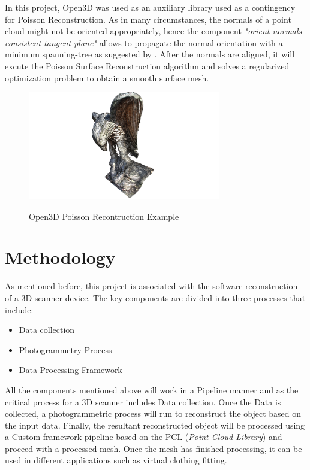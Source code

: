 \documentclass[12pt]{report}
\begin{document}
In this project, Open3D was used as an auxiliary library used as a contingency for Poisson Reconstruction. 
As in many circumstances, the normals of a point cloud might not be oriented appropriately, hence the component \textit{"orient normals consistent tangent plane"} allows to propagate the normal orientation with a minimum
spanning-tree as suggested by . 
After the normals are aligned, it will excute the Poisson Surface Reconstruction algorithm  and solves a regularized optimization problem to obtain a smooth surface mesh. 

\begin{figure}[H]%
  \centering
  \includegraphics[width=0.75\textwidth]{open3dpoisson.png}
 \caption{Open3D Poisson Recontruction Example}\cite[]{Zhou2018}
 \label{fig:Possion_exampple} 
\end{figure}




\chapter{Methodology}
As mentioned before, this project is associated with the software reconstruction of a 3D scanner device.
The key components are divided into three processes that include:

\begin{itemize}
  \item Data collection
  \item Photogrammetry Process
  \item Data Processing Framework
\end{itemize}

All the components mentioned above will work in a Pipeline manner and as the critical process for a 3D scanner includes  Data collection. 
Once the Data is collected, a photogrammetric process will run to reconstruct the object based on the input data. 
Finally, the resultant reconstructed object will be processed using a Custom framework pipeline based on the PCL (\textit{Point Cloud Library}) and proceed with a processed mesh.
Once the mesh has finished processing, it can be used in different applications such as virtual clothing fitting.
\end{document}
